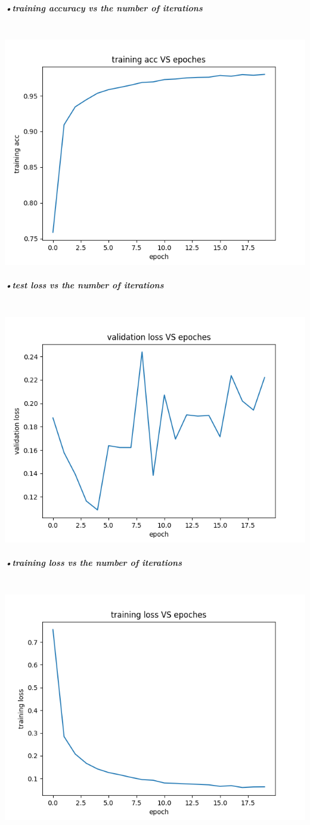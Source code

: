 \documentclass[11pt]{article} %
\begin{document}
\subparagraph{•training accuracy vs the number of iterations}\mbox{}\\
\includegraphics[scale=0.7]{e142train_acc.png}

\subparagraph{•test loss vs the number of iterations}\mbox{}\\
\includegraphics[scale=0.7]{e142val_loss.png}

\subparagraph{•training loss vs the number of iterations}\mbox{}\\
\includegraphics[scale=0.7]{e142train_loss.png}
\end{document}

